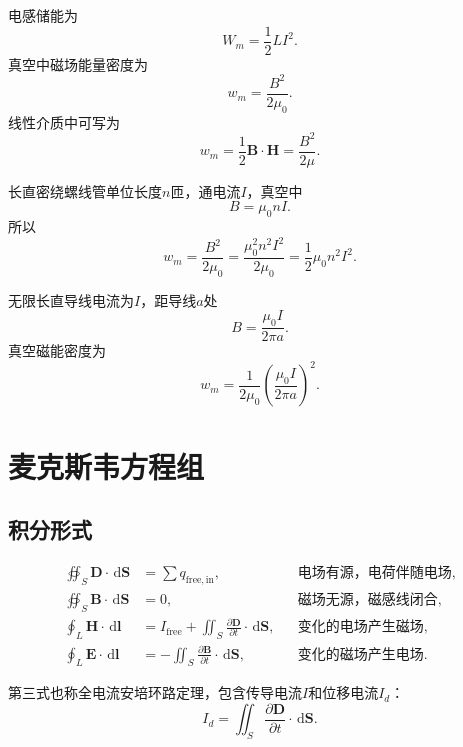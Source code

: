 \documentclass[UTF8,zihao=-4]{ctexart}
\newcommand{\dd}{\,\mathrm d}
\newcommand{\muz}{\mu_0}
\newcommand{\ve}[1]{\bm{#1}}
\newcommand{\E}{\ve E}
\newcommand{\B}{\ve B}
\newcommand{\D}{\ve D}
\newcommand{\Hf}{\ve H}
\newcommand{\dl}{\dd\ve l}
\newcommand{\dS}{\dd\ve S}
\begin{document}
电感储能为
\begin{equation}
\boxed{W_m=\frac12 LI^2}.
\end{equation}
真空中磁场能量密度为
\begin{equation}
\boxed{w_m=\frac{B^2}{2\muz}}.
\end{equation}
线性介质中可写为
\begin{equation}
 w_m=\frac12\B\cdot\Hf=\frac{B^2}{2\mu}.
\end{equation}

\begin{examplebox}[长直密绕螺线管内的磁能密度]
长直密绕螺线管单位长度\(n\)匝，通电流\(I\)，真空中
\[
B=\muz nI.
\]
所以
\[
w_m=\frac{B^2}{2\muz}=\frac{\muz^2n^2I^2}{2\muz}=\boxed{\frac12\muz n^2I^2}.
\]
\end{examplebox}

\begin{examplebox}[长直导线周围某点磁能密度]
无限长直导线电流为\(I\)，距导线\(a\)处
\[
B=\frac{\muz I}{2\pi a}.
\]
真空磁能密度为
\[
w_m=\frac{1}{2\muz}\left(\frac{\muz I}{2\pi a}\right)^2.
\]
\end{examplebox}

\section{麦克斯韦方程组}

\subsection{积分形式}

\begin{keybox}
\begin{align}
\oiint_S \D\cdot\dS&=\sum q_{\mathrm{free,in}}, &&\text{电场有源，电荷伴随电场}, \\
\oiint_S \B\cdot\dS&=0, &&\text{磁场无源，磁感线闭合}, \\
\oint_L \Hf\cdot\dl&=I_{\mathrm{free}}+\iint_S\frac{\partial\D}{\partial t}\cdot\dS,
&&\text{变化的电场产生磁场}, \\
\oint_L \E\cdot\dl&=-\iint_S\frac{\partial\B}{\partial t}\cdot\dS,
&&\text{变化的磁场产生电场}.
\end{align}
\end{keybox}

第三式也称全电流安培环路定理，包含传导电流\(I\)和位移电流\(I_d\)：
\begin{equation}
I_d=\iint_S\frac{\partial\D}{\partial t}\cdot\dS.
\end{equation}
\end{document}

